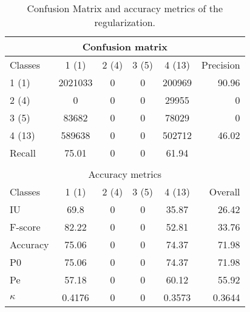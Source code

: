 \begin{table}[htbp]
\begin{center}
\begin{tabular}{|l|c|c|c|c|r|}
\hline
\multicolumn{6}{|c|}{Confusion matrix} \\
\hline
 Classes & 1 (1) & 2 (4) & 3 (5) & 4 (13) & Precision \\
\hline
1 (1) & 2021033 & 0 & 0 & 200969 & 90.96 \\
\hline
2 (4) & 0 & 0 & 0 & 29955 & 0 \\
\hline
3 (5) & 83682 & 0 & 0 & 78029 & 0 \\
\hline
4 (13) & 589638 & 0 & 0 & 502712 & 46.02 \\
\hline
Recall & 75.01 & 0 & 0 & 61.94 &  \\
\hline
\multicolumn{6}{c}{ } \\
\hline
\multicolumn{6}{|c|}{Accuracy metrics} \\
\hline
 Classes & 1 (1) & 2 (4) & 3 (5) & 4 (13) & Overall \\
\hline
IU & 69.8 & 0 & 0 & 35.87 & 26.42 \\
\hline
F-score & 82.22 & 0 & 0 & 52.81 & 33.76 \\
\hline
Accuracy & 75.06 & 0 & 0 & 74.37 & 71.98 \\
\hline
P0 & 75.06 & 0 & 0 & 74.37 & 71.98 \\
\hline
Pe & 57.18 & 0 & 0 & 60.12 & 55.92 \\
\hline
$\kappa$ & 0.4176 & 0 & 0 & 0.3573 & 0.3644 \\
\hline
\end{tabular}
\caption{Confusion Matrix and accuracy metrics of the regularization.}
\end{center}
\end{table}